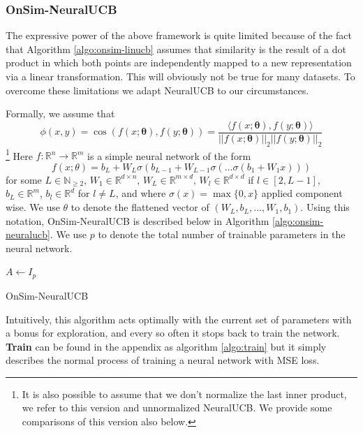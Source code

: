 \documentclass{article}
\begin{document}
\subsubsection{OnSim-NeuralUCB}
The expressive power of the above framework is quite limited because of the fact that Algorithm \ref{algo:onsim-linucb} assumes that similarity is the result
of a dot product in which both points are independently mapped to a new representation via a linear transformation. This will obviously not be true for many datasets.
To overcome these limitations we adapt NeuralUCB \cite{neuralucb} to our circumstances.

Formally, we assume that
\[ \phi(x,y) = \cos\left(f(x;\mathbf{\theta}), f(y;\mathbf{\theta})\right) = \frac{\langle f(x;\mathbf{\theta}), f(y;\mathbf{\theta}) \rangle}{||f(x;\mathbf{\theta})||_2 ||f(y;\mathbf{\theta})||_2}\]
\footnote{It is also possible to assume that we don't normalize the last inner product, we refer to this version and unnormalized NeuralUCB. We provide some comparisons of this version also below.}
Here $f: \mathbb{R}^n \to \mathbb{R}^m$ is a simple neural network of the form
\[ f(x; \theta) = b_L + W_{L} \sigma\left(b_{L-1} +  W_{L-1} \sigma\left( \dots \sigma\left(b_1 + W_1 x\right)\right) \right)\]
for some $L \in \mathbb{N}_{\geq 2}$, $W_1 \in \mathbb{R}^{d \times n}$, $W_{L} \in \mathbb{R}^{m \times d}$, $W_{l} \in \mathbb{R}^{d\times d}$ if $l \in [2, L-1]$, $b_L \in \mathbb{R}^m$, $b_l \in \mathbb{R}^d$ for $l \neq L$, and where $\sigma(x) = \max\{0, x\}$ applied component wise. We use $\theta$ to denote the flattened vector of $(W_L, b_L, \dots, W_1, b_1)$.
Using this notation, OnSim-NeuralUCB is described below in Algorithm \ref{algo:onsim-neuralucb}. We use $p$ to denote the total number of trainable parameters in the neural network.

\begin{algorithm}
    $A \gets I_{p}$\;
    \caption{OnSim-NeuralUCB}\label{algo:onsim-neuralucb}
  \end{algorithm}
Intuitively, this algorithm acts optimally with the current set of parameters with a bonus for exploration, and every so often it stops back to train the network.
\textbf{Train} can be found in the appendix as algorithm \ref{algo:train} but it simply describes the normal process of training a neural network with MSE loss.
\end{document}
